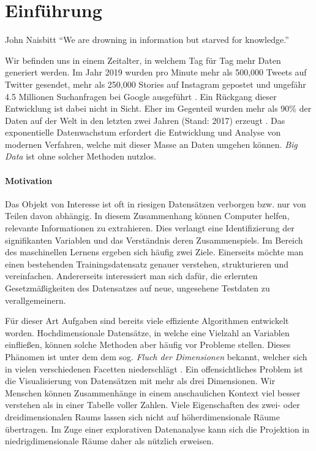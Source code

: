 \chapter{Einführung}

\label{introduction}

\begin{chapquote}{John Naisbitt}
``We are drowning in information but starved for knowledge.''
\end{chapquote}

Wir befinden uns in einem Zeitalter, in welchem Tag für Tag mehr Daten generiert werden. Im Jahr 2019 wurden pro Minute mehr als 500,000 Tweets auf Twitter gesendet, mehr als 250,000 Stories auf Instagram gepostet und ungefähr 4.5 Millionen Suchanfragen bei Google ausgeführt \cite{domo}. Ein Rückgang dieser Entwicklung ist dabei nicht in Sicht. Eher im Gegenteil wurden mehr als 90\% der Daten auf der Welt in den letzten zwei Jahren (Stand: 2017) erzeugt \cite{ibm}. Das exponentielle Datenwachstum erfordert die Entwicklung und Analyse von modernen Verfahren, welche mit dieser Masse an Daten umgehen können. \textit{Big Data} ist ohne solcher Methoden nutzlos.
 
 


\subsubsection{Motivation}

Das Objekt von Interesse ist oft in riesigen Datensätzen verborgen bzw. nur von Teilen davon abhängig. In diesem Zusammenhang können Computer helfen, relevante Informationen zu extrahieren. Dies verlangt eine Identifizierung der signifikanten Variablen und das Verständnis deren Zusammenspiels. Im Bereich des maschinellen Lernens ergeben sich häufig zwei Ziele. Einerseits möchte man einen bestehenden Trainingsdatensatz genauer verstehen, strukturieren und vereinfachen. Andererseits interessiert man sich dafür, die erlernten Gesetzmäßigkeiten des Datensatzes auf neue, ungesehene Testdaten zu verallgemeinern. 

Für dieser Art Aufgaben sind bereits viele effiziente Algorithmen entwickelt worden. Hochdimensionale Datensätze, in welche eine Vielzahl an Variablen einfließen, können solche Methoden aber häufig vor Probleme stellen. Dieses Phänomen ist unter dem dem sog. \textit{Fluch der Dimensionen} bekannt, welcher sich in vielen verschiedenen Facetten niederschlägt \cite{bellman}. Ein offensichtliches Problem ist die Visualisierung von Datensätzen mit mehr als drei Dimensionen. Wir Menschen können Zusammenhänge in einem anschaulichen Kontext viel besser verstehen als in einer Tabelle voller Zahlen. Viele Eigenschaften des zwei- oder dreidimensionalen Raums lassen sich nicht auf höherdimensionale Räume übertragen. Im Zuge einer explorativen Datenanalyse kann sich die Projektion in niedrigdimensionale Räume daher als nützlich erweisen.

